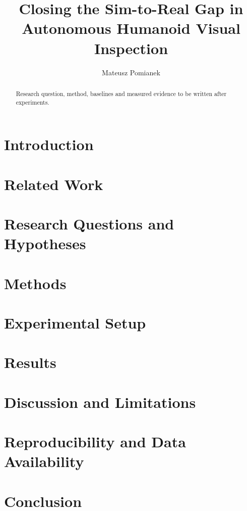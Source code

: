 \documentclass[11pt,a4paper]{article}
\title{Closing the Sim-to-Real Gap in Autonomous Humanoid Visual Inspection}
\author{Mateusz Pomianek}
\date{}
\begin{document}
\maketitle
\begin{abstract}
Research question, method, baselines and measured evidence to be written after experiments.
\end{abstract}
\section{Introduction}
\section{Related Work}
\section{Research Questions and Hypotheses}
\section{Methods}
\section{Experimental Setup}
\section{Results}
\section{Discussion and Limitations}
\section{Reproducibility and Data Availability}
\section{Conclusion}
\end{document}
